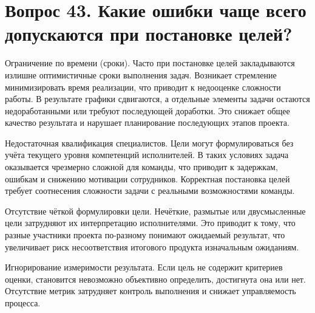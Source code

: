 \documentclass[14pt,a4paper]{extarticle}
\begin{document}
\newpage
\section{Вопрос 43. Какие ошибки чаще всего допускаются при постановке целей?}
Ограничение по времени (сроки). Часто при постановке целей закладываются излишне оптимистичные сроки выполнения задач. Возникает стремление минимизировать время реализации, что приводит к недооценке сложности работы. В результате графики сдвигаются, а отдельные элементы задачи остаются недоработанными или требуют последующей доработки. Это снижает общее качество результата и нарушает планирование последующих этапов проекта.

Недостаточная квалификация специалистов. Цели могут формулироваться без учёта текущего уровня компетенций исполнителей. В таких условиях задача оказывается чрезмерно сложной для команды, что приводит к задержкам, ошибкам и снижению мотивации сотрудников. Корректная постановка целей требует соотнесения сложности задачи с реальными возможностями команды.

Отсутствие чёткой формулировки цели. Нечёткие, размытые или двусмысленные цели затрудняют их интерпретацию исполнителями. Это приводит к тому, что разные участники проекта по-разному понимают ожидаемый результат, что увеличивает риск несоответствия итогового продукта изначальным ожиданиям.

Игнорирование измеримости результата. Если цель не содержит критериев оценки, становится невозможно объективно определить, достигнута она или нет. Отсутствие метрик затрудняет контроль выполнения и снижает управляемость процесса.
\end{document}
